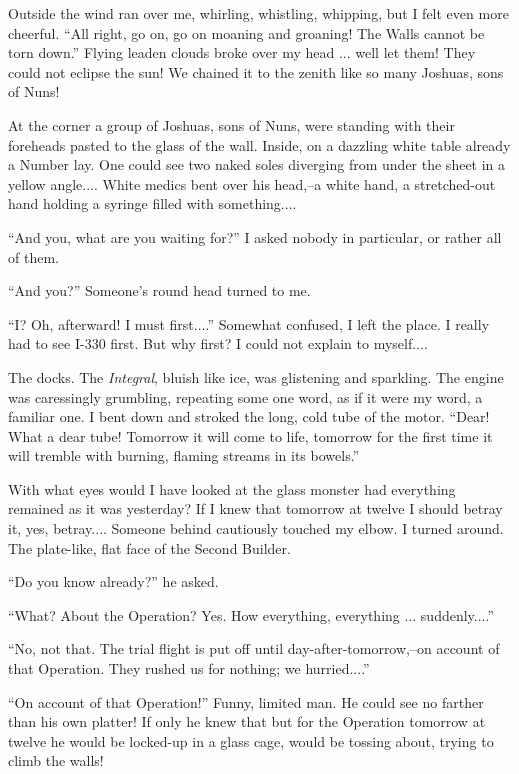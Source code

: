 \documentclass[11pt,openany]{book}
\begin{document}
Outside the wind ran over me, whirling, whistling, whipping, but I felt even more cheerful. ``All right, go on, go on moaning and groaning! The Walls cannot be torn down.'' Flying leaden clouds broke over my head ... well let them! They could not eclipse the sun! We chained it to the zenith like so many Joshuas, sons of Nuns!

At the corner a group of Joshuas, sons of Nuns, were standing with their foreheads pasted to the glass of the wall. Inside, on a dazzling white table already a Number lay. One could see two naked soles diverging from under the sheet in a yellow angle.... White medics bent over his head,--a white hand, a stretched-out hand holding a syringe filled with something....

``And you, what are you waiting for?'' I asked nobody in particular, or rather all of them.

``And you?'' Someone's round head turned to me.

``I? Oh, afterward! I must first....'' Somewhat confused, I left the place. I really had to see I-330 first. But why first? I could not explain to myself....

The docks. The \emph{Integral}, bluish like ice, was glistening and sparkling. The engine was caressingly grumbling, repeating some one word, as if it were my word, a familiar one. I bent down and stroked the long, cold tube of the motor. ``Dear! What a dear tube! Tomorrow it will come to life, tomorrow for the first time it will tremble with burning, flaming streams in its bowels.''

With what eyes would I have looked at the glass monster had everything remained as it was yesterday? If I knew that tomorrow at twelve I should betray it, yes, betray.... Someone behind cautiously touched my elbow. I turned around. The plate-like, flat face of the Second Builder.

``Do you know already?'' he asked.

``What? About the Operation? Yes. How everything, everything ... suddenly....''

``No, not that. The trial flight is put off until day-after-tomorrow,--on account of that Operation. They rushed us for nothing; we hurried....''

``On account of that Operation!'' Funny, limited man. He could see no farther than his own platter! If only he knew that but for the Operation tomorrow at twelve he would be locked-up in a glass cage, would be tossing about, trying to climb the walls!
\end{document}
